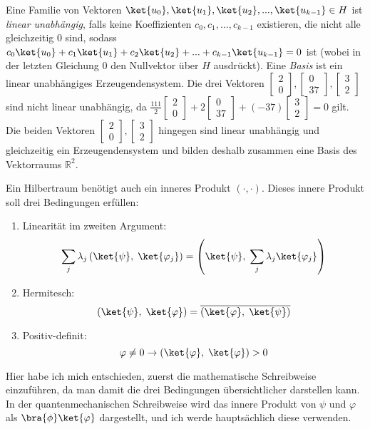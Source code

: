 Eine Familie von Vektoren $\ket{u_0}, \ket{u_1}, \ket{u_2}, ..., \ket{u_{k - 1}} \in H$ ist \textit{linear unabhängig}, falls keine Koeffizienten $c_0, c_1, ..., c_{k - 1}$ existieren, die nicht alle gleichzeitig $0$ sind, sodass $c_0\ket{u_0} + c_1\ket{u_1} + c_2\ket{u_2} + ... + c_{k - 1}\ket{u_{k - 1}} = 0$ ist (wobei in der letzten Gleichung 0 den Nullvektor über $H$ ausdrückt). Eine \textit{Basis} ist ein linear unabhängiges Erzeugendensystem. Die drei Vektoren $\begin{bmatrix}2 \\ 0\end{bmatrix}, \begin{bmatrix} 0 \\ 37\end{bmatrix}, \begin{bmatrix}3 \\ 2\end{bmatrix}$ sind nicht linear unabhängig, da $\frac{111}{2}\begin{bmatrix}2 \\ 0\end{bmatrix} + 2\begin{bmatrix} 0 \\ 37\end{bmatrix} + (-37)\begin{bmatrix}3 \\ 2\end{bmatrix} = 0$ gilt. Die beiden Vektoren $\begin{bmatrix}2 \\ 0\end{bmatrix}, \begin{bmatrix}3 \\ 2\end{bmatrix}$ hingegen sind linear unabhängig und gleichzeitig ein Erzeugendensystem und bilden deshalb zusammen eine Basis des Vektorraums $\mathbb{R}^2$.

Ein Hilbertraum benötigt auch ein inneres Produkt $\left( \cdot, \cdot \right)$. Dieses innere Produkt soll drei Bedingungen erfüllen:
\begin{enumerate}
    \item Linearität im zweiten Argument: $$\sum_j\lambda_j\left(\ket{\psi}, \; \ket{\varphi_j}\right) = \left(\ket{\psi}, \; \sum_j\lambda_j\ket{\varphi_j}\right)$$
    \item Hermitesch: $$\left(\ket{\psi}, \; \ket{\varphi} \right) = \overline{\left(\ket{\varphi} , \; \ket{\psi}\right)}$$
    \item Positiv-definit: $$\varphi \neq 0 \rightarrow \left( \ket{\varphi}, \; \ket{\varphi} \right) > 0$$
\end{enumerate}
Hier habe ich mich entschieden, zuerst die mathematische Schreibweise einzuführen, da man damit die drei Bedingungen übersichtlicher darstellen kann. In der quantenmechanischen Schreibweise wird das innere Produkt von $\psi$ und $\varphi$ als $\bra{\phi}\ket{\varphi}$ dargestellt, und ich werde hauptsächlich diese verwenden.

